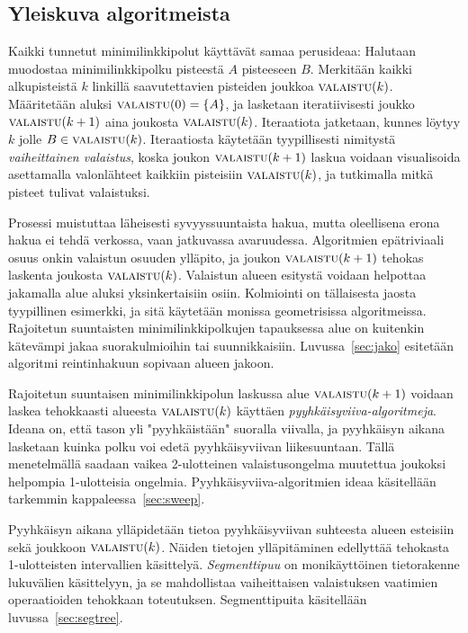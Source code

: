\documentclass[finnish]{tktltiki2}
\theoremstyle{definition}
\theoremstyle{remark}
\newcommand\set[1]{\ensuremath{\left\{#1\right\}}\xspace}
\newcommand\reach[1]{\ensuremath{\textsc{valaistu}(#1)}\xspace}
\begin{document}
\subsection{Yleiskuva algoritmeista}\label{sec:yleiskuva}

Kaikki tunnetut minimilinkkipolut käyttävät samaa perusideaa:
Halutaan muodostaa minimilinkkipolku pisteestä $A$ pisteeseen $B$.
Merkitään kaikki alkupisteistä $k$ linkillä saavutettavien pisteiden joukkoa \reach{k}.
Määritetään aluksi $\reach{0}=\set{A}$, ja lasketaan iteratiivisesti joukko \reach{k+1} aina joukosta \reach{k}.
Iteraatiota jatketaan, kunnes löytyy $k$ jolle $B\in\reach{k}$.
Iteraatiosta käytetään tyypillisesti nimitystä \emph{vaiheittainen valaistus}, koska joukon \reach{k+1} laskua voidaan visualisoida asettamalla valonlähteet kaikkiin pisteisiin \reach{k}, ja tutkimalla mitkä pisteet tulivat valaistuksi.

Prosessi muistuttaa läheisesti syvyyssuuntaista hakua, mutta oleellisena erona hakua ei tehdä verkossa, vaan jatkuvassa avaruudessa.
Algoritmien epätriviaali osuus onkin valaistun osuuden ylläpito, ja joukon \reach{k+1} tehokas laskenta joukosta \reach{k}.
Valaistun alueen esitystä voidaan helpottaa jakamalla alue aluksi yksinkertaisiin osiin.
Kolmiointi on tällaisesta jaosta tyypillinen esimerkki, ja sitä käytetään monissa geometrisissa algoritmeissa.
Rajoitetun suuntaisten minimilinkkipolkujen tapauksessa alue on kuitenkin kätevämpi jakaa suorakulmioihin tai suunnikkaisiin.
Luvussa~\ref{sec:jako} esitetään algoritmi reintinhakuun sopivaan alueen jakoon.

Rajoitetun suuntaisen minimilinkkipolun laskussa alue \reach{k+1} voidaan laskea tehokkaasti alueesta \reach{k} käyttäen \emph{pyyhkäisyviiva-algoritmeja}.
Ideana on, että tason yli "pyyhkäistään" suoralla viivalla, ja pyyhkäisyn aikana lasketaan kuinka polku voi edetä pyyhkäisyviivan liikesuuntaan.
Tällä menetelmällä saadaan vaikea 2-ulotteinen valaistusongelma muutettua joukoksi helpompia 1-ulotteisia ongelmia.
Pyyhkäisyviiva-algoritmien ideaa käsitellään tarkemmin kappaleessa~\ref{sec:sweep}.

Pyyhkäisyn aikana ylläpidetään tietoa pyyhkäisyviivan suhteesta alueen esteisiin sekä joukkoon \reach{k}.
Näiden tietojen ylläpitäminen edellyttää tehokasta 1-ulotteisten intervallien käsittelyä.
\emph{Segmenttipuu} on monikäyttöinen tietorakenne lukuvälien käsittelyyn, ja se mahdollistaa vaiheittaisen valaistuksen vaatimien operaatioiden tehokkaan toteutuksen.
Segmenttipuita käsitellään luvussa~\ref{sec:segtree}.
\end{document}
